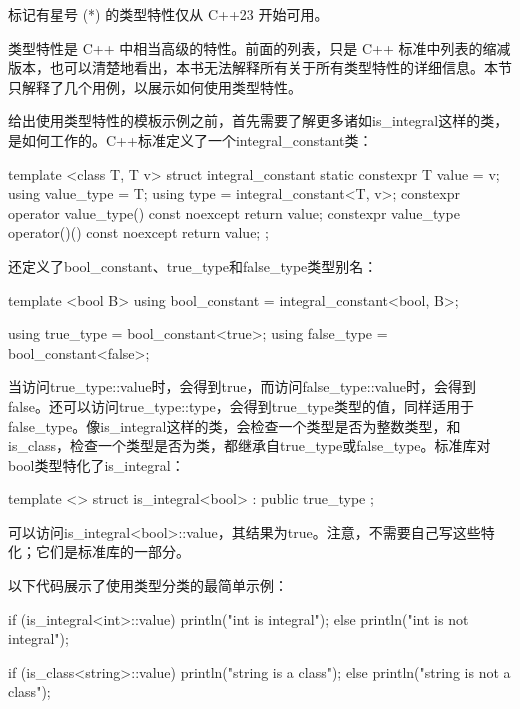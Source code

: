 标记有星号 (*) 的类型特性仅从 C++23 开始可用。

类型特性是 C++ 中相当高级的特性。前面的列表，只是 C++ 标准中列表的缩减版本，也可以清楚地看出，本书无法解释所有关于所有类型特性的详细信息。本节只解释了几个用例，以展示如何使用类型特性。


给出使用类型特性的模板示例之前，首先需要了解更多诸如is\_integral这样的类，是如何工作的。C++标准定义了一个integral\_constant类：

\begin{cpp}
template <class T, T v>
struct integral_constant {
    static constexpr T value = v;
    using value_type = T;
    using type = integral_constant<T, v>;
    constexpr operator value_type() const noexcept { return value; }
    constexpr value_type operator()() const noexcept { return value; }
};
\end{cpp}

还定义了bool\_constant、true\_type和false\_type类型别名：

\begin{cpp}
template <bool B>
using bool_constant = integral_constant<bool, B>;

using true_type = bool_constant<true>;
using false_type = bool_constant<false>;
\end{cpp}

当访问true\_type::value时，会得到true，而访问false\_type::value时，会得到false。还可以访问true\_type::type，会得到true\_type类型的值，同样适用于false\_type。像is\_integral这样的类，会检查一个类型是否为整数类型，和is\_class，检查一个类型是否为类，都继承自true\_type或false\_type。标准库对bool类型特化了is\_integral：

\begin{cpp}
template <> struct is_integral<bool> : public true_type { };
\end{cpp}

可以访问is\_integral<bool>::value，其结果为true。注意，不需要自己写这些特化；它们是标准库的一部分。

以下代码展示了使用类型分类的最简单示例：

\begin{cpp}
if (is_integral<int>::value) { println("int is integral"); }
else { println("int is not integral"); }

if (is_class<string>::value) { println("string is a class"); }
else { println("string is not a class"); }
\end{cpp}

